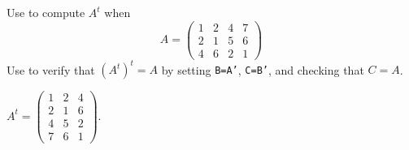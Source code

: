 \documentclass{ximera}
\begin{document}
\begin{computerExercise} \label{c1.3.5a}
Use \Matlab to compute $A^t$ when
\begin{equation} 
A = \left(\begin{array}{cccc} 
1 & 2 & 4 & 7 \\ 2 & 1 & 5 & 6 \\  4 & 6 & 2 & 1 
\end{array}\right)
\end{equation}
Use \Matlab to verify that $(A^t)^t=A$ by setting {\tt B=A'}, {\tt C=B'},
and checking that $C=A$.

\begin{solution}
\ans $A^t =
\left(\begin{array}{rrr}
1 & 2 & 4 \\
2 & 1 & 6 \\
4 & 5 & 2 \\
7 & 6 & 1
\end{array}\right).$

\end{solution}
\end{computerExercise}
\end{document}
